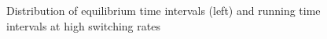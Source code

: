 \documentclass[12pt,a4paper]{article}
\begin{document}
\begin{figure}[H]
	\hspace*{-0.5cm}
	\caption{Distribution of equilibrium time intervals (left) and running time intervals at high switching rates}
	\label{intdistanhopf}
\end{figure}
\end{document}
